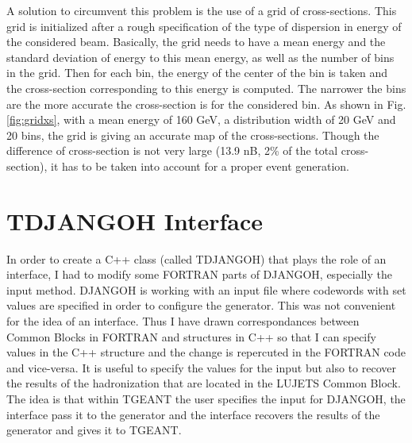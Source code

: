 \newpage

A solution to circumvent this problem is the use
of a grid of cross-sections. This grid is initialized after a rough specification of the
type of dispersion in energy of the considered beam.
Basically, the grid needs to have
a mean energy and the standard deviation of energy to this mean energy, as well as the
number of bins in the grid. Then for each bin, the energy of the center of the bin is taken
and the cross-section corresponding to this energy is computed. The narrower the bins are
the more accurate the cross-section is for the considered bin. As shown in Fig. \ref{fig:gridxs}, with a
mean energy of 160 GeV, a distribution width of 20 GeV and 20 bins, the grid is giving an
accurate map of the cross-sections. Though the difference of cross-section is not very large (13.9 nB, 2\% of
the total cross-section), it has to be taken into account for a proper event generation.


\section{TDJANGOH Interface}

In order to create a C++ class (called TDJANGOH) that plays the role of an interface, I had to modify some
FORTRAN parts of DJANGOH, especially the input method. DJANGOH is working with an input
file where codewords with set values are specified in order to configure the generator.
This was not convenient for the idea of an interface. Thus I have drawn
correspondances between Common Blocks in FORTRAN and structures in C++ so that I can specify
values in the C++ structure and the change is repercuted in the FORTRAN code and vice-versa.
It is useful to specify the values for the input but also to recover the results of the
hadronization that are located in the LUJETS Common Block.
The idea is that within TGEANT the user specifies the input for DJANGOH, the interface
pass it to the generator and the interface recovers the results of the generator and gives
it to TGEANT.
